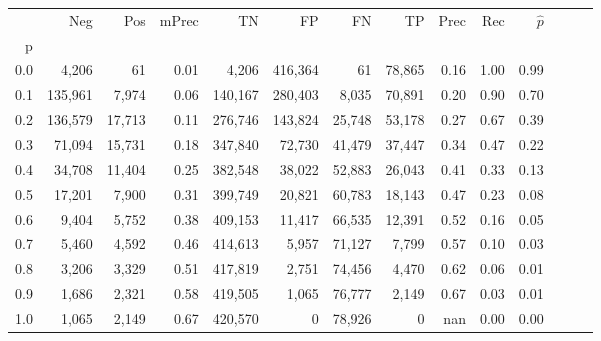 \begin{tabular}{rrrrrrrrrrrrrr}
\toprule
{} &      Neg &     Pos & mPrec &       TN &       FP &      FN &      TP &  Prec &   Rec & $\hat{p}$ \\
p   &          &         &       &          &          &         &         &       &       &           \\
\midrule
0.0 &    4,206 &      61 &  0.01 &    4,206 &  416,364 &      61 &  78,865 &  0.16 &  1.00 &      0.99 \\
0.1 &  135,961 &   7,974 &  0.06 &  140,167 &  280,403 &   8,035 &  70,891 &  0.20 &  0.90 &      0.70 \\
0.2 &  136,579 &  17,713 &  0.11 &  276,746 &  143,824 &  25,748 &  53,178 &  0.27 &  0.67 &      0.39 \\
0.3 &   71,094 &  15,731 &  0.18 &  347,840 &   72,730 &  41,479 &  37,447 &  0.34 &  0.47 &      0.22 \\
0.4 &   34,708 &  11,404 &  0.25 &  382,548 &   38,022 &  52,883 &  26,043 &  0.41 &  0.33 &      0.13 \\
0.5 &   17,201 &   7,900 &  0.31 &  399,749 &   20,821 &  60,783 &  18,143 &  0.47 &  0.23 &      0.08 \\
0.6 &    9,404 &   5,752 &  0.38 &  409,153 &   11,417 &  66,535 &  12,391 &  0.52 &  0.16 &      0.05 \\
0.7 &    5,460 &   4,592 &  0.46 &  414,613 &    5,957 &  71,127 &   7,799 &  0.57 &  0.10 &      0.03 \\
0.8 &    3,206 &   3,329 &  0.51 &  417,819 &    2,751 &  74,456 &   4,470 &  0.62 &  0.06 &      0.01 \\
0.9 &    1,686 &   2,321 &  0.58 &  419,505 &    1,065 &  76,777 &   2,149 &  0.67 &  0.03 &      0.01 \\
1.0 &    1,065 &   2,149 &  0.67 &  420,570 &        0 &  78,926 &       0 &   nan &  0.00 &      0.00 \\
\bottomrule
\end{tabular}
